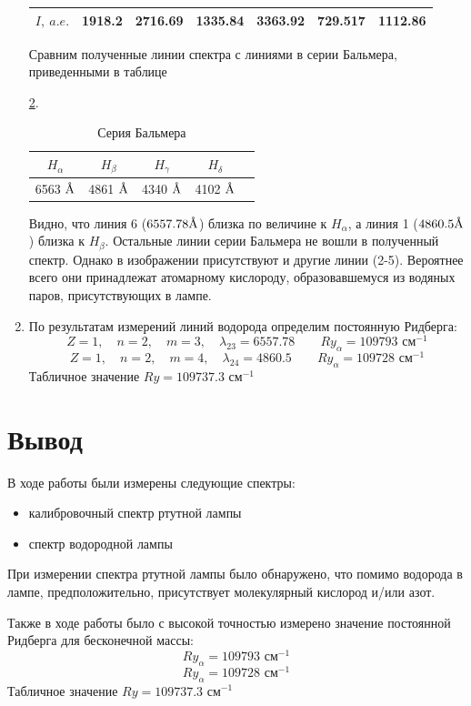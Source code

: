 \documentclass[a4paper, 12pt]{article}
\newcommand{\angstrom}{\textup{\AA}}
\begin{document}
\begin{enumerate}
\begin{table}[!htb]
\begin{tabular}{|c|c|c|c|c|c|c|}
                $I,\ a.e.$ & 1918.2 & 2716.69 & 1335.84 & 3363.92 & 729.517 & 1112.86 \\
                \hline
		    \end{tabular}
		    \label{table:peaks}
		\end{table}
		Сравним полученные линии спектра с линиями в серии Бальмера, приведенными в таблице\par \ref{table:balmer}.
		\begin{table}[!htb]
		    \centering
		    \caption{Серия Бальмера}
		    \begin{tabular}{|c|c|c|c|c|}
		        \hline
		        $H_{\alpha}$ & $H_{\beta}$ & $H_{\gamma}$ & $H_{\delta}$\\
		        \hline
		         6563 $\angstrom$ & 4861 $\angstrom$ & 4340 $\angstrom$ & 4102 $\angstrom$\\
		         \hline
		    \end{tabular}
		    \label{table:balmer}
		\end{table}\par
		Видно, что линия 6 ($6557.78\angstrom$) близка по величине к $H_{\alpha}$, а линия 1 ($4860.5\angstrom$) близка к $H_{\beta}$. Остальные линии серии Бальмера не вошли в полученный спектр. Однако в изображении присутствуют и другие линии (2-5). Вероятнее всего они принадлежат атомарному кислороду, образовавшемуся из водяных паров, присутствующих в лампе.
		\item По результатам измерений линий водорода определим постоянную Ридберга:
		\begin{equation*}
		    Z=1,\quad n=2,\quad m=3,\quad \lambda_{23}=6557.78\qquad Ry_\alpha=109793 \text{ см}^{-1}
		\end{equation*}
		\begin{equation*}
		Z=1,\quad n=2,\quad m=4,\quad \lambda_{24}=4860.5\qquad Ry_\alpha=109728 \text{ см}^{-1}
		\end{equation*}
		Табличное значение $Ry=109737.3\text{ см}^{-1}$
\end{enumerate}
\section{Вывод}
В ходе работы были измерены следующие спектры:
\begin{itemize}
    \item калибровочный спектр ртутной лампы
    \item спектр водородной лампы
\end{itemize}
При измерении спектра ртутной лампы было обнаружено, что помимо водорода в лампе, предположительно, присутствует молекулярный кислород и/или азот.\par
Также в ходе работы было с высокой точностью измерено значение постоянной Ридберга для бесконечной массы:
\begin{equation*}
Ry_\alpha=109793 \text{ см}^{-1}
\end{equation*}
\begin{equation*}
Ry_\alpha=109728 \text{ см}^{-1}
\end{equation*}
Табличное значение $Ry=109737.3\text{ см}^{-1}$
\end{document}
